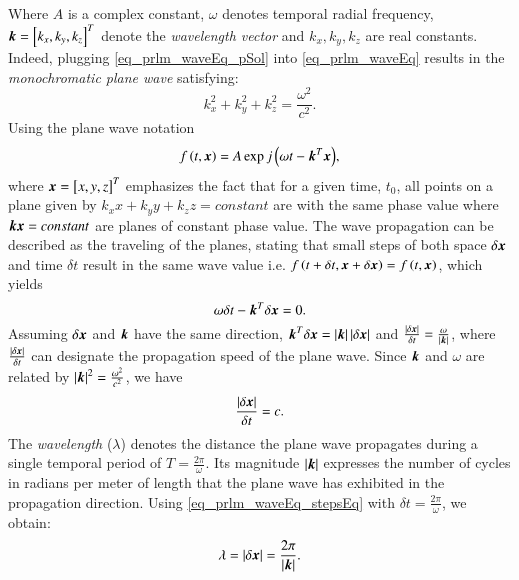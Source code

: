 Where $A$ is a complex constant, $\omega$ denotes temporal radial frequency, $\boldsymbol{k} = \left[{k_{x},k_{y},k_{z}}\right]^{T}$ denote the \emph{wavelength vector} and $k_{x},k_{y},k_{z}$ are real constants. 
Indeed, plugging \eqref{eq_prlm_waveEq_pSol} into \eqref{eq_prlm_waveEq} results in the \emph{monochromatic plane wave} satisfying:
\begin{equation}
\label{eq_prlm_waveEq_subs}
k_{x}^{2}+k_{y}^{2}+k_{z}^{2} = \frac{\omega^{2}}{c^{2}}.
\end{equation}
Using the plane wave notation
\begin{equation}
\label{eq_prlm_waveEq_finSol}
f\left({t,\boldsymbol{x}}\right)=A\exp{j\left({\omega{t}-\boldsymbol{k}^{T}\boldsymbol{x}}\right)},
\end{equation}
where $ \boldsymbol{x} = \left[{x,y,z}\right]^{T} $ emphasizes the fact that for a given time, $t_{0}$, all points on a plane given by $k_{x}x+k_{y}y+k_{z}z = constant$ are with the same phase value where $\boldsymbol{k}\boldsymbol{x}=constant$ are planes of constant phase value.
The wave propagation can be described as the traveling of the planes, stating that small steps of both space $\delta{\boldsymbol{x}}$ and time $\delta{t}$ result in the same wave value i.e. $f\left({t+\delta{t},\boldsymbol{x}+\delta{\boldsymbol{x}}}\right) = f\left({t,\boldsymbol{x}}\right)$, which yields
\begin{equation}
\omega\delta{t}-\boldsymbol{k}^{T}\delta\boldsymbol{x}=0.
\end{equation}
Assuming $\delta\boldsymbol{x}$ and $\boldsymbol{k}$ have the same direction, $\boldsymbol{k}^{T}\delta\boldsymbol{x} = \left\vert\boldsymbol{k}\right\vert\left\vert\delta\boldsymbol{x}\right\vert$ and $\frac{\left\vert\delta{\boldsymbol{x}}\right\vert}{\delta{t}} = \frac{\omega}{\left\vert\boldsymbol{k}\right\vert}$, where $\frac{\left\vert\delta{\boldsymbol{x}}\right\vert}{\delta{t}}$ can designate the propagation speed of the plane wave. 
Since $\boldsymbol{k}$ and $\omega$ are related by $\left\vert\boldsymbol{k}\right\vert^{2}=\frac{\omega^{2}}{c^{2}}$, we have
\begin{equation}
\label{eq_prlm_waveEq_stepsEq}
\frac{\left\vert\delta{\boldsymbol{x}}\right\vert}{\delta{t}}=c.
\end{equation}
The \emph{wavelength} ($\lambda$) denotes the distance the plane wave propagates during a single temporal period of $T=\frac{2\pi}{\omega}$.
Its magnitude $\left\vert\boldsymbol{k}\right\vert$ expresses the number of cycles in radians per meter of length that the plane wave has exhibited in the propagation direction.
Using \eqref{eq_prlm_waveEq_stepsEq} with $\delta{t} = \frac{2\pi}{\omega}$, we obtain:
\begin{equation}
\lambda=\left\vert\delta{\boldsymbol{x}}\right\vert=\frac{2\pi}{\left\vert\boldsymbol{k}\right\vert}.
\end{equation}
